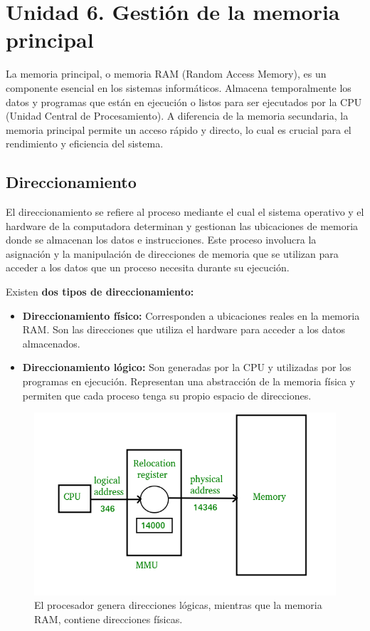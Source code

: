 \chapter{Unidad 6. Gestión de la memoria principal}
La memoria principal, o memoria RAM (Random Access Memory), es un componente esencial en los sistemas informáticos. 
Almacena temporalmente los datos y programas que están en ejecución o listos para ser ejecutados por la CPU (Unidad Central de Procesamiento). A diferencia de la memoria secundaria, la memoria principal permite un acceso rápido y directo, lo cual es crucial para el rendimiento y eficiencia del sistema.
\section{
	Direccionamiento
}
El direccionamiento se refiere al proceso mediante el cual el sistema operativo y el hardware de la computadora determinan y gestionan las ubicaciones de memoria donde se almacenan los datos e instrucciones. Este proceso involucra la asignación y la manipulación de direcciones de memoria que se utilizan para acceder a los datos que un proceso necesita durante su ejecución.

Existen \textbf{dos tipos de direccionamiento:}
\begin{itemize}
	\item \textbf{Direccionamiento físico:} Corresponden a ubicaciones reales en la memoria RAM. Son las direcciones que utiliza el hardware para acceder a los datos almacenados.
	\item \textbf{Direccionamiento lógico:} Son generadas por la CPU y utilizadas por los programas en ejecución. Representan una abstracción de la memoria física y permiten que cada proceso tenga su propio espacio de direcciones.
\end{itemize}
\begin{figure}[H] \centering \includegraphics[width=0.6\linewidth]{Imagenes/direccionamiento.png} \caption{El procesador genera direcciones lógicas, mientras que la memoria RAM, contiene direcciones físicas.} \end{figure}

